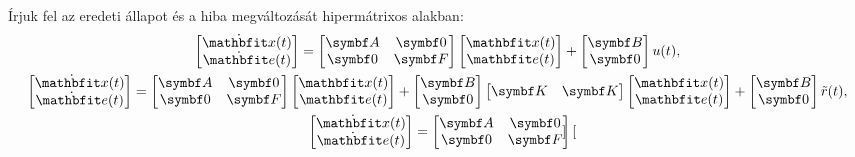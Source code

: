 Írjuk fel az eredeti állapot és a hiba megváltozását hipermátrixos alakban:
\begin{gather}
  \begin{bmatrix}
    \dot{\rvec x}(t) \\ \dot{\rvec e}(t)
  \end{bmatrix} = \begin{bmatrix}
    \rmat A & \rmat 0 \\ \rmat 0 & \rmat F
  \end{bmatrix} \begin{bmatrix}
    \rvec x(t) \\ \rvec e(t)
  \end{bmatrix} + \begin{bmatrix}
    \rmat B \\ \rmat 0
  \end{bmatrix} u(t)
  ,
  \\
  \begin{bmatrix}
    \dot{\rvec x}(t) \\ \dot{\rvec e}(t)
  \end{bmatrix} = \begin{bmatrix}
    \rmat A & \rmat 0 \\ \rmat 0 & \rmat F
  \end{bmatrix} \begin{bmatrix}
    \rvec x(t) \\ \rvec e(t)
  \end{bmatrix} + \begin{bmatrix}
    \rmat B \\ \rmat 0
  \end{bmatrix} \begin{bmatrix}
    \rmat K & \rmat K
  \end{bmatrix} \begin{bmatrix}
    \rvec x(t) \\ \rvec e(t)
  \end{bmatrix} + \begin{bmatrix}
    \rmat B \\ \rmat 0
  \end{bmatrix} \tilde r(t)
  ,
  \\
  \begin{bmatrix}
    \dot{\rvec x}(t) \\ \dot{\rvec e}(t)
  \end{bmatrix} = \begin{bmatrix}
    \rmat A & \rmat 0 \\ \rmat 0 & \rmat F
  \end{bmatrix} \begin{bmatrix}

\end{bmatrix}
\end{gather}
